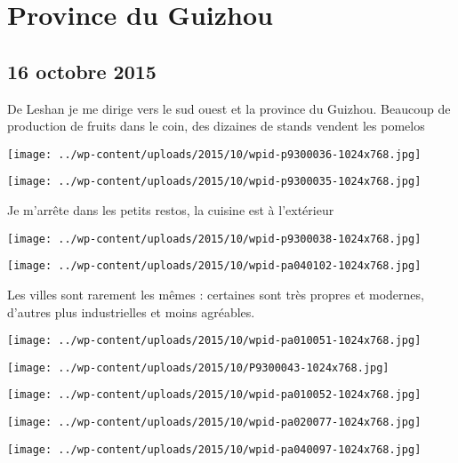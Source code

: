\chapter{Province du Guizhou}
\section*{16 octobre 2015}
De Leshan je me dirige vers le sud ouest et la province du Guizhou. \newline
 Beaucoup de production de fruits dans le coin, des dizaines de stands vendent les pomelos \newline
 \newline
\centerline{\texttt{[image: ../wp-content/uploads/2015/10/wpid-p9300036-1024x768.jpg]} } 
 \newline
 \newline
\centerline{\texttt{[image: ../wp-content/uploads/2015/10/wpid-p9300035-1024x768.jpg]} } 
 \newline
 Je m'arrête dans les petits restos, la cuisine est à l'extérieur \newline
 \newline
\centerline{\texttt{[image: ../wp-content/uploads/2015/10/wpid-p9300038-1024x768.jpg]} } 
 \newline
 \newline
\centerline{\texttt{[image: ../wp-content/uploads/2015/10/wpid-pa040102-1024x768.jpg]} } 
 \newline
 Les villes sont rarement les mêmes : certaines sont très propres et modernes, d'autres plus industrielles et moins agréables. \newline
 \newline
\centerline{\texttt{[image: ../wp-content/uploads/2015/10/wpid-pa010051-1024x768.jpg]} } 
 \newline
 \newline
\centerline{\texttt{[image: ../wp-content/uploads/2015/10/P9300043-1024x768.jpg]} } 
 \newline
 \newline
\centerline{\texttt{[image: ../wp-content/uploads/2015/10/wpid-pa010052-1024x768.jpg]} } 
 \newline
 \newline
\centerline{\texttt{[image: ../wp-content/uploads/2015/10/wpid-pa020077-1024x768.jpg]} } 
 \newline
 \newline
\centerline{\texttt{[image: ../wp-content/uploads/2015/10/wpid-pa040097-1024x768.jpg]} } 
